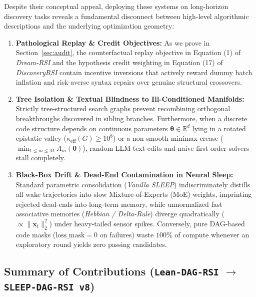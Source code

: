 \documentclass[11pt,a4paper]{article}
\begin{document}
Despite their conceptual appeal, deploying these systems on long-horizon discovery tasks reveals a fundamental disconnect between high-level algorithmic descriptions and the underlying optimization geometry:
\begin{enumerate}
\item \textbf{Pathological Replay \& Credit Objectives:} As we prove in Section~\ref{sec:audit}, the counterfactual replay objective in Equation (1) of \emph{Dream-RSI} and the hypothesis credit weighting in Equation (17) of \emph{DiscoveryRSI} contain incentive inversions that actively reward dummy batch inflation and risk-averse syntax repairs over genuine structural crossovers.
\item \textbf{Tree Isolation \& Textual Blindness to Ill-Conditioned Manifolds:} Strictly tree-structured search graphs prevent recombining orthogonal breakthroughs discovered in sibling branches. Furthermore, when a discrete code structure depends on continuous parameters $\boldsymbol{\theta} \in \mathbb{R}^d$ lying in a rotated epistatic valley ($\kappa_{\text{eff}}(G) \ge 10^8$) or a non-smooth minimax crease ($\min_{1 \le m \le M} A_m(\boldsymbol{\theta})$), random LLM text edits and naive first-order solvers stall completely.
\item \textbf{Black-Box Drift \& Dead-End Contamination in Neural Sleep:} Standard parametric consolidation (\emph{Vanilla SLEEP}) indiscriminately distills all wake trajectories into slow Mixture-of-Experts (MoE) weights, imprinting rejected dead-ends into long-term memory, while unnormalized fast associative memories (\emph{Hebbian / Delta-Rule}) diverge quadratically ($\propto \|\mathbf{x}_t\|_2^2$) under heavy-tailed sensor spikes. Conversely, pure DAG-based code masks ($\text{loss\_mask} = 0$ on failures) waste $100\%$ of compute whenever an exploratory round yields zero passing candidates.
\end{enumerate}

\subsection{Summary of Contributions (\texttt{Lean-DAG-RSI} $\to$ \texttt{SLEEP-DAG-RSI v8})}
\end{document}
